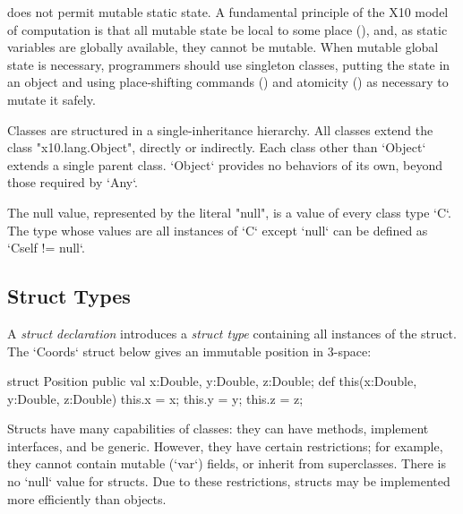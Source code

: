 \Xten{} does not permit mutable static state. A fundamental principle of the
X10 model of computation is that all mutable state be local to some place
(), and, as static variables are
globally available, they
cannot be mutable. When mutable global state is necessary, programmers should
use singleton classes, putting the state in an object and using place-shifting
commands () and atomicity () as necessary
to mutate it safely.


Classes are structured in a single-inheritance hierarchy. All classes extend
the class \xcd"x10.lang.Object", directly or indirectly. Each class other than
\xcd`Object` extends a single parent class.  \xcd`Object` provides no behaviors
of its own, beyond those required by \xcd`Any`.





The null value, represented by the literal
\xcd"null", is a value of every class type \xcd`C`. The type whose values are
all instances of \xcd`C` except 
\xcd`null` can be defined as \xcd`C{self != null}`.

\subsection{Struct Types}

A {\em struct declaration}  introduces a {\em struct type}
containing all instances of the struct.  The \xcd`Coords` struct below gives
an immutable position in 3-space: 
\begin{xten}
struct Position {
  public val x:Double, y:Double, z:Double; 
  def this(x:Double, y:Double, z:Double) {
     this.x = x; this.y = y; this.z = z;
  }
}
\end{xten}
%

Structs have many capabilities of classes: they can have methods, implement
interfaces, and be generic. However, they have certain restrictions; for
example, they cannot contain mutable (\xcd`var`) fields, or inherit from
superclasses. There is no \xcd`null` value for structs. Due to these
restrictions, structs may be implemented more efficiently than objects.


